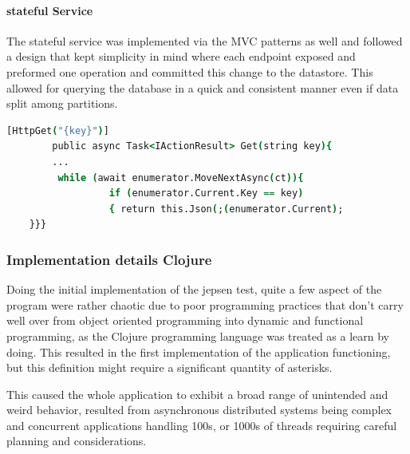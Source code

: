 \documentclass[a4paper,10pt,titlepage]{report}
\begin{document}
\paragraph{stateful Service}

The stateful service was implemented via the MVC patterns as well and followed a design that kept simplicity in mind where each endpoint exposed and preformed one operation and committed this change to the datastore. This allowed for querying the database in a quick and consistent manner even if data split among  partitions.
\begin{lstlisting}[language=csh]
        [HttpGet("{key}")]
        public async Task<IActionResult> Get(string key){
        ...
         while (await enumerator.MoveNextAsync(ct)){
                  if (enumerator.Current.Key == key)
                  { return this.Json(;(enumerator.Current);
    }}}
\end{lstlisting}   

\subsubsection{Implementation details Clojure}
 
 Doing the initial implementation of the jepsen test, quite a few aspect of the program were rather chaotic due to poor programming practices that don't carry well over from object oriented  programming into dynamic and functional programming, as the Clojure programming language was treated as a learn by doing. This resulted in the first implementation of the application functioning, but this definition might require a significant quantity of asterisks.
 
 This caused the whole application to exhibit a broad range of unintended and weird behavior, resulted from asynchronous distributed systems being complex and concurrent applications handling 100s, or 1000s of threads requiring careful planning and considerations.
        
\end{document}
